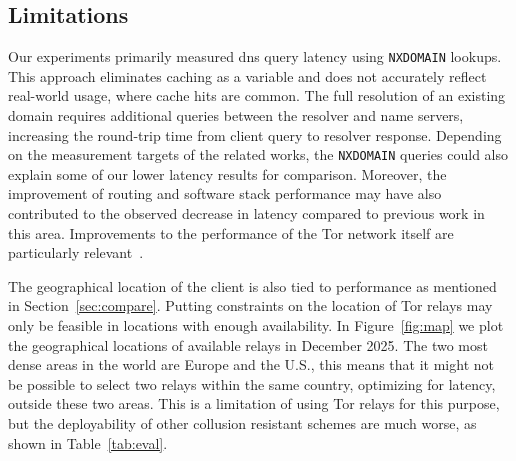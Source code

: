 \subsection{Limitations} \label{sec:limit} 

Our experiments primarily measured \ac{dns} query latency using
\texttt{NXDOMAIN} lookups. This approach eliminates caching as a variable and
does not accurately reflect real-world usage, where cache hits are common. The
full resolution of an existing domain requires additional queries between the
resolver and name servers, increasing the round-trip time from client query to
resolver response. Depending on the measurement targets of the related works,
the \texttt{NXDOMAIN} queries could also explain some of our lower latency
results for comparison. Moreover, the improvement of routing and software stack
performance may have also contributed to the observed decrease in latency
compared to previous work in this area. Improvements to the performance of the
Tor network itself are particularly relevant~\cite{TorCongestion,
TorPerformance}.

The geographical location of the client is also tied to performance as
mentioned in Section~\ref{sec:compare}. Putting constraints on the location of
Tor relays may only be feasible in locations with enough availability. In
Figure~\ref{fig:map} we plot the geographical locations of available relays in
December 2025. The two most dense areas in the world are Europe and the U.S.,
this means that it might not be possible to select two relays within the same
country, optimizing for latency, outside these two areas. This is a limitation
of using Tor relays for this purpose, but the deployability of other collusion
resistant schemes are much worse, as shown in Table~\ref{tab:eval}.

